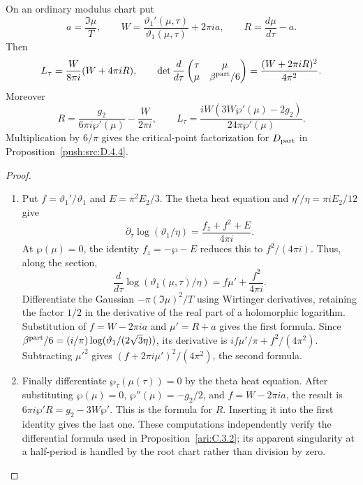 \begin{proposition}\hypertarget{tag-001L}{}\label{ari:C.8.11}

On an ordinary modulus chart put
\[
 a=\frac{\Im\mu}{T},\qquad
 W=\frac{\vartheta_1'(\mu,\tau)}{\vartheta_1(\mu,\tau)}
                         +2\pi ia,\qquad
 R=\frac{d\mu}{d\tau}-a.
\]
Then
\[
 L_\tau=\frac{W}{8\pi i}(W+4\pi iR),\qquad
 \det\frac{d}{d\tau}
 \begin{pmatrix}\tau&\mu\\\mu&\beta^{\rm part}/6\end{pmatrix}
       =\frac{(W+2\pi iR)^2}{4\pi^2}.
\]
Moreover
\[
 R=\frac{g_2}{6\pi i\wp'(\mu)}-\frac{W}{2\pi i},
 \qquad
 L_\tau=\frac{iW(3W\wp'(\mu)-2g_2)}
                         {24\pi\wp'(\mu)}.
\]
Multiplication by $6/\pi$ gives the critical-point factorization for
$D_{\rm part}$ in Proposition~\ref{push:src:D.4.4}.
\end{proposition}


\begin{proof}
\begin{enumerate}[label=\arabic*.,leftmargin=*]
\item Put $f=\vartheta_1'/\vartheta_1$ and
$E=\pi^2E_2/3$. The theta heat equation and
$\eta'/\eta=\pi iE_2/12$ give
\[
 \partial_\tau\log(\vartheta_1/\eta)
       =\frac{f_z+f^2+E}{4\pi i}.
\]
At $\wp(\mu)=0$, the identity $f_z=-\wp-E$ reduces
this to $f^2/(4\pi i)$. Thus, along the section,
\[
 \frac{d}{d\tau}\log(\vartheta_1(\mu,\tau)/\eta)
       =f\mu'+\frac{f^2}{4\pi i}.
\]
Differentiate the Gaussian $-\pi(\Im\mu)^2/T$ using
Wirtinger derivatives, retaining the factor $1/2$ in
the derivative of the real part of a holomorphic logarithm.
Substitution of $f=W-2\pi ia$ and $\mu'=R+a$ gives the
first formula. Since
$\beta^{\rm part}/6=(i/\pi)\log(\vartheta_1/(2\sqrt3\eta))$,
its derivative is $if\mu'/\pi+f^2/(4\pi^2)$.
Subtracting $\mu'^2$ gives
$(f+2\pi i\mu')^2/(4\pi^2)$, the second formula.

\item Finally differentiate $\wp_\tau(\mu(\tau))=0$ by the theta
heat equation. After substituting $\wp(\mu)=0$,
$\wp''(\mu)=-g_2/2$, and $f=W-2\pi ia$, the result is
$6\pi i\wp'R=g_2-3W\wp'$. This is the formula for $R$.
Inserting it into the first identity gives the last one.
These computations independently verify the differential formula used in Proposition~\ref{ari:C.3.2};
its apparent singularity at a half-period is
handled by the root chart rather than division by zero.
\end{enumerate}
\end{proof}



